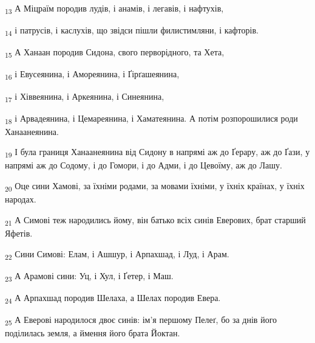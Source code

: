 \begin{tcolorbox}
\textsubscript{13} А Міцраїм породив лудів, і анамів, і легавів, і нафтухів,
\end{tcolorbox}
\begin{tcolorbox}
\textsubscript{14} і патрусів, і каслухів, що звідси пішли филистимляни, і кафторів.
\end{tcolorbox}
\begin{tcolorbox}
\textsubscript{15} А Ханаан породив Сидона, свого перворідного, та Хета,
\end{tcolorbox}
\begin{tcolorbox}
\textsubscript{16} і Евусеянина, і Амореянина, і Ґірґашеянина,
\end{tcolorbox}
\begin{tcolorbox}
\textsubscript{17} і Хіввеянина, і Аркеянина, і Синеянина,
\end{tcolorbox}
\begin{tcolorbox}
\textsubscript{18} і Арвадеянина, і Цемареянина, і Хаматеянина. А потім розпорошилися роди Ханаанеянина.
\end{tcolorbox}
\begin{tcolorbox}
\textsubscript{19} І була границя Ханаанеянина від Сидону в напрямі аж до Ґерару, аж до Ґази, у напрямі аж до Содому, і до Гомори, і до Адми, і до Цевоїму, аж до Лашу.
\end{tcolorbox}
\begin{tcolorbox}
\textsubscript{20} Оце сини Хамові, за їхніми родами, за мовами їхніми, у їхніх країнах, у їхніх народах.
\end{tcolorbox}
\begin{tcolorbox}
\textsubscript{21} А Симові теж народились йому, він батько всіх синів Еверових, брат старший Яфетів.
\end{tcolorbox}
\begin{tcolorbox}
\textsubscript{22} Сини Симові: Елам, і Ашшур, і Арпахшад, і Луд, і Арам.
\end{tcolorbox}
\begin{tcolorbox}
\textsubscript{23} А Арамові сини: Уц, і Хул, і Ґетер, і Маш.
\end{tcolorbox}
\begin{tcolorbox}
\textsubscript{24} А Арпахшад породив Шелаха, а Шелах породив Евера.
\end{tcolorbox}
\begin{tcolorbox}
\textsubscript{25} А Еверові народилося двоє синів: ім'я першому Пелеґ, бо за днів його поділилась земля, а ймення його брата Йоктан.
\end{tcolorbox}
